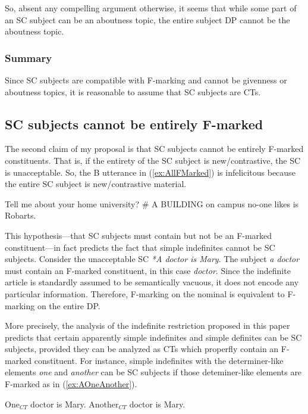 \documentclass[
]{RCL}
\begin{document}
So, absent any compelling argument otherwise, it seems that while some part of an SC subject can be an aboutness topic, the entire subject DP cannot be the aboutness topic.

\subsubsection{Summary}
Since SC subjects are compatible with F-marking and cannot be givenness or aboutness topics, it is reasonable to assume that SC subjects are CTs.
\subsection{SC subjects cannot be entirely F-marked}
The second claim of my proposal is that SC subjects cannot be entirely F-marked constituents.
That is, if the entirety of the SC subject is new/contrastive, the SC is unacceptable.
So, the B utterance in (\ref{ex:AllFMarked}) is infelicitous because the entire SC subject is new/contrastive material.
\begin{exe}
\ex\label{ex:AllFMarked}
\begin{xlist}
	 Tell me about your home university?
	\# A BUILDING on campus no-one likes is Robarts.
\end{xlist}	
\end{exe}
This hypothesis---that SC subjects must contain but not be an F-marked constituent---in fact predicts the fact that simple indefinites cannot be SC subjects.
Consider the unacceptable SC \textit{*A doctor is Mary}.
The subject \textit{a doctor} must contain an F-marked constituent, in this case \textit{doctor}.
Since the indefinite article is standardly assumed to be semantically vacuous, it does not encode any particular information.
Therefore, F-marking on the nominal is equivalent to F-marking on the entire DP.

More precisely, the analysis of the indefinite restriction proposed in this paper predicts that certain apparently simple indefinites and simple definites can be SC subjects, provided they can be analyzed as CTs which properfly contain an F-marked constituent.
For instance, simple indefinites with the determiner-like elements \textit{one} and \textit{another} can be SC subjects if those deteminer-like elements are F-marked as in (\ref{ex:AOneAnother}).
\begin{exe}
\ex\label{ex:AOneAnother}
\begin{xlist}
	\ex\label{ex:OneCT} One$_{CT}$ doctor is Mary.
	\ex\label{ex:AnotherCT} Another$_{CT}$ doctor is Mary.
\end{xlist}
\end{exe}
\end{document}
